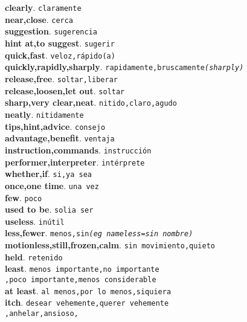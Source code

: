 \documentclass[twocolumn]{article}
\begin{document}
	\textsf{\textbf{clearly}}. \texttt{claramente}\\
	\textsf{\textbf{near,close}}. \texttt{cerca}\\
	\textsf{\textbf{suggestion}}. \texttt{sugerencia}\\
	\textsf{\textbf{hint at,to suggest}}. \texttt{sugerir}\\
	\textsf{\textbf{quick,fast}}. \texttt{veloz,r\'apido(a)}\\
	\textsf{\textbf{quickly,rapidly,sharply}}. \texttt{rapidamente,bruscamente{\scriptsize \textsl{(sharply)}}}\\
	\textsf{\textbf{release,free}}. \texttt{soltar,liberar}\\
	\textsf{\textbf{release,loosen,let out}}. \texttt{soltar}\\
	\textsf{\textbf{sharp,very clear,neat}}. \texttt{nitido,claro,agudo}\\
	\textsf{\textbf{neatly}}. \texttt{nitidamente}\\
	\textsf{\textbf{tips,hint,advice}}. \texttt{consejo}\\
	\textsf{\textbf{advantage,benefit}}. \texttt{ventaja}\\
	\textsf{\textbf{instruction,commands}}. \texttt{instrucci\'on}\\
	\textsf{\textbf{performer,interpreter}}. \texttt{int\'erprete}\\
	\textsf{\textbf{whether,if}}. \texttt{si,ya sea}\\
	\textsf{\textbf{once,one time}}. \texttt{una vez}\\
	\textsf{\textbf{few}}. \texttt{poco}\\
	\textsf{\textbf{used to be}}. \texttt{solia ser}\\
	\textsf{\textbf{useless}}. \texttt{in\'util}\\
	\textsf{\textbf{less,fewer}}. \texttt{menos,sin{\scriptsize \textsl{(eg nameless=sin nombre)}}}\\
	\textsf{\textbf{motionless,still,frozen,calm}}. \texttt{sin movimiento,quieto}\\
	\textsf{\textbf{held}}. \texttt{retenido}\\
	\textsf{\textbf{least}}. \texttt{menos importante,no importante\\,poco importante,menos considerable}\\
	\textsf{\textbf{at least}}. \texttt{al menos,por lo menos,siquiera}\\
	\textsf{\textbf{itch}}. \texttt{desear vehemente,querer vehemente\\,anhelar,ansioso,}\\
\end{document}
